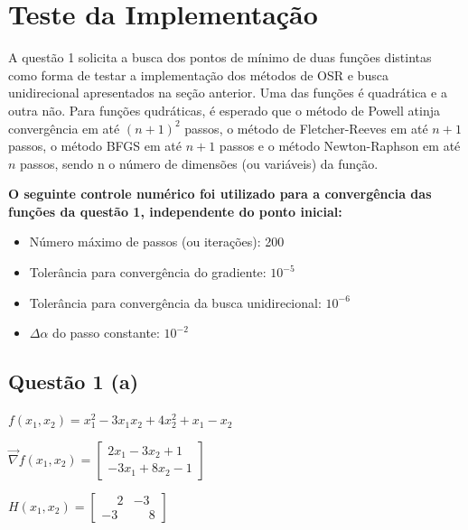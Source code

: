 \documentclass[10pt, a4paper]{article}
\begin{document}
\section{Teste da Implementação}
A questão 1 solicita a busca dos pontos de mínimo de duas funções distintas como forma de testar a implementação
dos métodos de OSR e busca unidirecional apresentados na seção anterior.
Uma das funções é quadrática e a outra não. Para funções qudráticas,
é esperado que o método de Powell atinja convergência em até $(n + 1)^2$ passos,
o método de Fletcher-Reeves em até $n + 1$ passos, o método BFGS em até $n + 1$ passos e
o método Newton-Raphson em até $n$ passos, sendo n o número de dimensões (ou variáveis) da função.

\vspace{5mm}
\textbf{O seguinte controle numérico foi utilizado para a convergência das funções da questão 1,
 independente do ponto inicial:}

\begin{itemize}
  \item Número máximo de passos (ou iterações): 200
  \item Tolerância para convergência do gradiente: $10^{-5}$
  \item Tolerância para convergência da busca unidirecional: $10^{-6}$
  \item $\Delta\alpha$ do passo constante: $10^{-2}$
\end{itemize}

\subsection{Questão 1 (a)}

\vspace{5mm}

\begin{center}
$f(x_1,x_2) = x_1^2 - 3x_1x_2 + 4x_2^2 + x_1 - x_2$

\vspace{5mm}
$\overrightarrow{\nabla} f(x_1,x_2) = 
\begin{bmatrix}
  2x_1 - 3x_2 + 1 \\ -3x_1 + 8x_2 -1
\end{bmatrix}$

\vspace{5mm}

$H(x_1,x_2) = 
\begin{bmatrix}
  \phantom{-}2 & -3 \\ -3 & \phantom{-}8
\end{bmatrix}$

\end{center}
\end{document}
